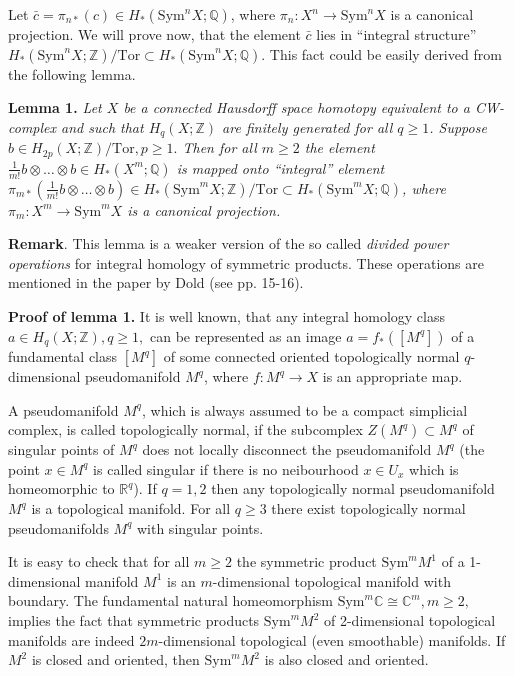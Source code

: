\documentclass[a4paper,14pt]{article}
\newcommand{\Sym}{\mathrm{Sym}}
\newcommand{\Tor}{\mathrm{Tor}}
\newcommand{\Q}{\mathbb{Q}}
\newcommand{\R}{\mathbb{R}}
\newcommand{\Z}{\mathbb{Z}}
\begin{document}
Let $\bar{c}=\pi_{n*}(c) \in H_*(\Sym^n X;\Q)$, where $\pi_n:X^n \to \Sym^n X$ is a canonical projection. We will prove now, that the element $\bar{c}$ lies in ``integral structure'' $H_*(\Sym^n X;\Z)/\Tor \subset H_*(\Sym^n X;\Q)$. This fact could be easily derived from the following lemma.



\textbf{Lemma 1.}{\it{ Let $X$ be a connected Hausdorff space homotopy equivalent to a CW-complex and such that $H_q(X;\Z)$ are finitely generated for all $q\ge 1$.  Suppose $b\in H_{2p}(X;\Z)/\Tor, p\ge 1.$ Then for all $m\ge 2$ the element $\frac{1}{m!}b\otimes \ldots \otimes b\in H_*(X^m;\Q)$ is mapped onto ``integral'' element $\pi_{m*}(\frac{1}{m!}b\otimes \ldots \otimes b)\in H_*(\Sym^m X;\Z)/\Tor\subset H_*(\Sym^m X;\Q)$, where $\pi_m:X^m\to \Sym^m X$ is a canonical projection.}}


\textbf{Remark}. This lemma is a weaker version of the so called {\it divided power operations} for integral homology of symmetric products. These operations are mentioned in the  paper \cite{Dold2} by Dold (see pp. 15-16).   


\textbf{Proof of lemma 1.} It is well known, that any integral homology class $a\in H_q(X;\Z), q\ge 1,$ can be represented as an image $a = f_*([M^q])$ of a fundamental class $[M^q]$ of some connected oriented topologically normal $q$-dimensional pseudomanifold $M^q$, where $f:M^q\to X$ is an appropriate map. 

A pseudomanifold $M^q$, which is always assumed to be a compact simplicial complex, is called topologically normal, if the subcomplex $Z(M^q)\subset M^q$ of singular points of $M^q$ does not locally disconnect the pseudomanifold $M^q$ (the point $x\in M^q$ is called singular if there is no neibourhood $x\in U_x$ which is homeomorphic to $\R^q$). If $q=1,2$ then any topologically normal pseudomanifold $M^q$ is a topological manifold. For all $q\ge 3$ there exist topologically normal pseudomanifolds $M^q$ with singular points. 

It is easy to check that for all $m\ge 2$ the symmetric product $\Sym^m M^1$ of a 1-dimensional manifold $M^1$ is an $m$-dimensional topological manifold with boundary. The fundamental natural homeomorphism $\Sym ^m \mathbb{C}\cong \mathbb{C}^m, m\ge 2,$ implies the fact that symmetric products $\Sym^m M^2$ of 2-dimensional topological manifolds are indeed $2m$-dimensional topological (even smoothable) manifolds. If $M^2$ is closed and oriented, then $\Sym^m M^2$ is also closed and oriented. 
\end{document}
